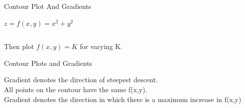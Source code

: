 \documentclass{beamer}
\begin{document}
\begin{frame}{Contour Plot And Gradients}

$z = f(x,y) = x^{2} + y^{2}$\\

\begin{columns}
	\pause \begin{column}{0.6\textwidth}
		\begin{adjustbox}{max totalsize={\textwidth},center}
			
		\end{adjustbox}
		
	\end{column}
	\pause \begin{column}{0.5\textwidth}
		\begin{adjustbox}{max totalsize={\textwidth},center}
		\end{adjustbox}
	\end{column}
\end{columns}

Then plot $f(x,y)=K$ for varying K.


\end{frame}








\begin{frame}{Contour Plots and Gradients}
    
    Gradient denotes the direction of steepest descent.\\
    All points on the contour have the same f(x,y).\\
    Gradient denotes the direction in which there is a maximum increase in f(x,y)\\

    
    
\end{frame}
\end{document}
